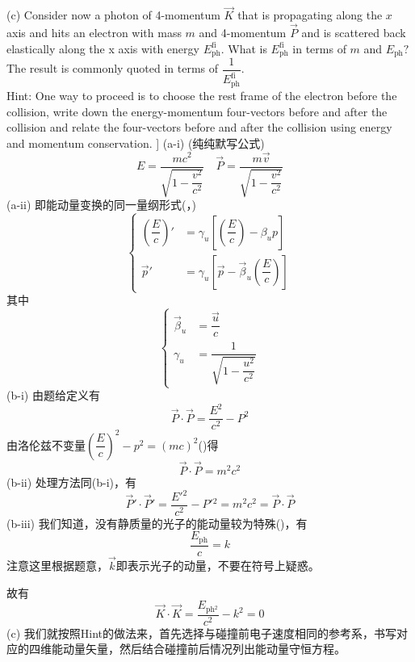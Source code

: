 \begin{solution}
	(c) Consider now a photon of 4-momentum $\vec{K}$ that is propagating along the $x$ axis and hits an electron with mass $m$ and 4-momentum $\vec{P}$ and is scattered back elastically along the x axis with energy $E_{\mathrm{ph}}^{\mathrm{fi}}.$ What is $E_\mathrm{ph}^\mathrm{fi}$ in terms of $m$ and $E_\mathrm{ph}?$ The result is commonly quoted in terms of $\dfrac{1}{E_\mathrm{ph}^\mathrm{fi}}$.\\
	Hint: One way to proceed is to choose the rest frame of the electron before the collision, write down the energy-momentum four-vectors before and after the collision and relate the four-vectors before and after the collision using energy and momentum conservation.
	]
(a-i) (纯纯默写公式)
    \[E=\frac{mc^{2}}{\sqrt{1-\dfrac{v^2}{c^{2}}}}\quad\vec{P}=\frac{m\vec{v}}{\sqrt{1-\dfrac{v^2}{c^{2}}}}\]
    (a-ii) 即能动量变换的同一量纲形式(，)
    \[\left\{\begin{aligned}
    	\left(\dfrac{E}{c}\right)'&=\gamma_u\left[\left(\dfrac{E}{c}\right)-\beta_u p\right]\\
    	\vec{p}'&=\gamma_u\left[\vec{p}-\vec{\beta}_u\left(\dfrac{E}{c}\right)\right]
    \end{aligned}\right.\]
    其中
    \[\left\{\begin{aligned}
    	\vec{\beta}_u&=\dfrac{\vec{u}}{c}\\
    	\gamma_u&=\dfrac{1}{\sqrt{1-\dfrac{u^2}{c^2}}}
    \end{aligned}\right.\]
(b-i) 由题给定义有
 \[\vec{P}\cdot \vec{P}= \frac {E^{2}}{c^{2}}- P^{2}\]
由洛伦兹不变量$\left(\dfrac{E}{c}\right)^2-p^2=(mc)^2$()得
\[\vec{P}\cdot\vec{P}=m^2c^2\]
 (b-ii) 处理方法同(b-i)，有
\[\vec{P}'\cdot \vec{P}'= \frac {E'{}^{2}}{c^{2}}- P'{}^{2}=m^2c^2=\vec{P}\cdot\vec{P}\]
(b-iii) 我们知道，没有静质量的光子的能动量较为特殊()，有
\[\dfrac{E_{\mathrm{ph}}}{c}=k\]
注意这里根据题意，$\vec{k}$即表示光子的动量，不要在符号上疑惑。

故有
\[\vec{K}\cdot\vec{K}=\dfrac{E_{\mathrm{ph}{}^2}}{c^2}-k^2=0\]
(c) 我们就按照Hint的做法来，首先选择与碰撞前电子速度相同的参考系，书写对应的四维能动量矢量，然后结合碰撞前后情况列出能动量守恒方程。


\end{solution}
